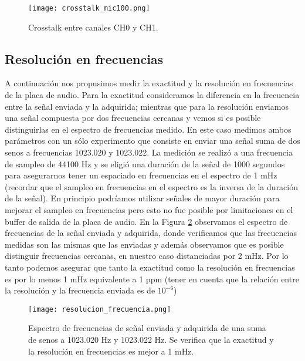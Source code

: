 \documentclass[a4paper, 11pt]{article}
\begin{document}
\begin{figure} [H]
\centering
\texttt{[image: crosstalk\_mic100.png]}
\caption{Crosstalk entre canales CH0 y CH1. \label{fig:crosstalk_mic100}}
\end{figure} 

\subsection*{Resolución en frecuencias}
A continuación nos propusimos medir la exactitud y la resolución en frecuencias de la placa de audio. Para la exactitud consideramos la diferencia en la frecuencia entre la señal enviada y la adquirida; mientras que para la resolución enviamos una señal compuesta por dos frecuencias cercanas y vemos si es posible distinguirlas en el espectro de frecuencias medido. En este caso medimos ambos parámetros con un sólo experimento que consiste en enviar una señal suma de dos senos a frecuencias 1023.020 y 1023.022. La medición se realizó a una frecuencia de sampleo de 44100 Hz y se eligió una duración de la señal de 1000 segundos para asegurarnos tener un espaciado en frecuencias en el espectro de 1 mHz (recordar que el sampleo en frecuencias en el espectro es la inversa de la duración de la señal). En principio podríamos utilizar señales de mayor duración para mejorar el sampleo en frecuencias pero esto no fue posible por limitaciones en el buffer de salida de la placa de audio. En la Figura  \ref{fig:resolucion_frecuencia} observamos el espectro de frecuencias de la señal enviada y adquirida, donde verificamos que las frecuencias medidas son las mismas que las enviadas y además observamos que es posible distinguir frecuencias cercanas, en nuestro caso distanciadas por 2 mHz. Por lo tanto podemos asegurar que tanto la exactitud como la resolución en frecuencias es por lo menos 1 mHz equivalente a 1 ppm (tener en cuenta que la relación entre la resolución y la frecuencia enviada es de $10^{-6}$)


\begin{figure} [H]
\centering
\texttt{[image: resolucion\_frecuencia.png]}
\caption{Espectro de frecuencias de señal enviada y adquirida de una suma de senos a 1023.020 Hz y 1023.022 Hz. Se verifica que la exactitud y la resolución en frecuencias es mejor a 1 mHz.\label{fig:resolucion_frecuencia}}
\end{figure} 
\end{document}
